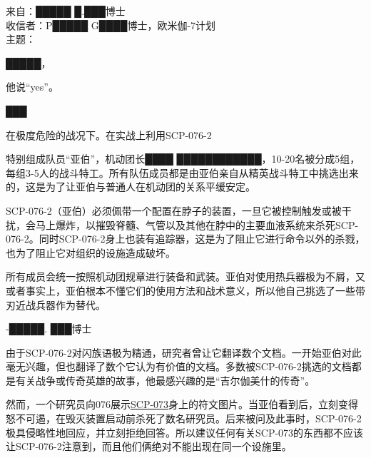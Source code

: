 \hr

\begin{scpbox}

来自：█████ █.███博士\\
收信者：P█████ G████博士，欧米伽-7计划\\
主题：

█████，

他说“yes”。

███

\end{scpbox}

\hr


\begin{scpbox}

在极度危险的战况下。在实战上利用SCP-076-2

特别组成队员“亚伯”，机动团长████ ████████████，10-20名被分成5组，每组3-5人的战斗特工。所有队伍成员都是由亚伯亲自从精英战斗特工中挑选出来的，这是为了让亚伯与普通人在机动团的关系平缓安定。

SCP-076-2（亚伯）必须佩带一个配置在脖子的装置，一旦它被控制触发或被干扰，会马上爆炸，以摧毁脊髓、气管以及其他在脖中的主要血液系统来杀死SCP-076-2。同时SCP-076-2身上也装有追踪器，这是为了阻止它进行命令以外的杀戮，也为了阻止它对组织的设施造成破坏。

所有成员会统一按照机动团规章进行装备和武装。亚伯对使用热兵器极为不屑，又或者事实上，亚伯根本不懂它们的使用方法和战术意义，所以他自己挑选了一些带刃近战兵器作为替代。

-█████. ███博士

\end{scpbox}

\hr


\begin{scpbox}

由于SCP-076-2对闪族语极为精通，研究者曾让它翻译数个文档。一开始亚伯对此毫无兴趣，但也翻译了数个它认为有价值的文档。多数被SCP-076-2挑选的文档都是有关战争或传奇英雄的故事，他最感兴趣的是“吉尔伽美什的传奇”。

然而，一个研究员向076展示\hyperref[chap:SCP-073]{SCP-073}身上的符文图片。当亚伯看到后，立刻变得怒不可遏，在毁灭装置启动前杀死了数名研究员。后来被问及此事时，SCP-076-2极具侵略性地回应，并立刻拒绝回答。所以建议任何有关SCP-073的东西都不应该让SCP-076-2注意到，而且他们俩绝对不能出现在同一个设施里。

\end{scpbox}

